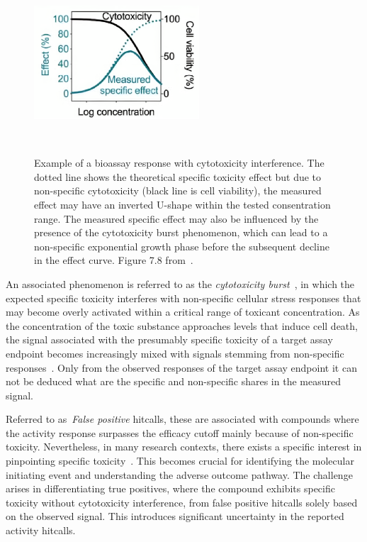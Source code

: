 \begin{figure}[htbp]  %
    \centering
    \includegraphics[width=0.55\textwidth]{figures/cytotoxicity.png}  
    \caption{Example of a bioassay response with cytotoxicity interference. The dotted line shows the theoretical specific toxicity effect but due to non-specific cytotoxicity (black line is cell viability), the measured effect may have an inverted U-shape within the tested consentration range. The measured specific effect may also be influenced by the presence of the cytotoxicity burst phenomenon, which can lead to a non-specific exponential growth phase before the subsequent decline in the effect curve. Figure 7.8 from~\cite{escher2021}.}
~\label{fig:cytotoxicity} 
\end{figure}

An associated phenomenon is referred to as the \emph{cytotoxicity burst}~\cite{judson2016}, in which the expected specific toxicity interferes with non-specific cellular stress responses that may become overly activated within a critical range of toxicant concentration. As the concentration of the toxic substance approaches levels that induce cell death, the signal associated with the presumably specific toxicity of a target assay endpoint becomes increasingly mixed with signals stemming from non-specific responses~\cite{escher2021}. Only from the observed responses of the target assay endpoint it can not be deduced what are the specific and non-specific shares in the measured signal.

Referred to as~\emph{False positive} hitcalls, these are associated with compounds where the activity response surpasses the efficacy cutoff mainly because of non-specific toxicity. Nevertheless, in many research contexts, there exists a specific interest in pinpointing specific toxicity~\cite{fay2018}. This becomes crucial for identifying the molecular initiating event and understanding the adverse outcome pathway. The challenge arises in differentiating true positives, where the compound exhibits specific toxicity without cytotoxicity interference, from false positive hitcalls solely based on the observed signal. This introduces significant uncertainty in the reported activity hitcalls.

